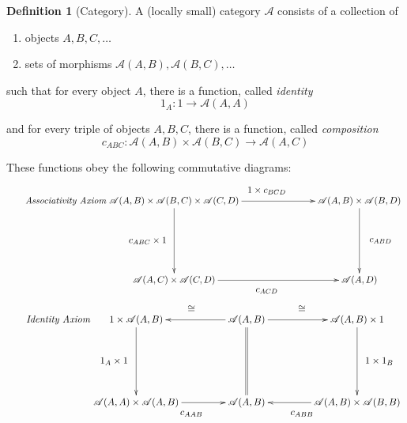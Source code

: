 \documentclass[11pt]{article}
\theoremstyle{definition}
\newtheorem*{defn}{Definition}
\theoremstyle{definition}
\theoremstyle{plain}
\theoremstyle{plain}
\theoremstyle{plain}
\begin{document}
\begin{defn}[Category]
A (locally small) category $\mathscr{A}$ consists of a collection of

\begin{enumerate}
\item objects $A, B, C, \dots$
\item sets of morphisms $\mathscr{A}(A,B), \mathscr{A}(B,C), \dots$
\end{enumerate}

such that for every object $A$, there is a function, called \emph{identity}
\begin{equation*}
1_A: 1 \to \mathscr{A}(A,A)
\end{equation*}

and for every triple of objects $A, B, C$, there is a function, called \emph{composition}
\begin{equation*}
c_{ABC}: \mathscr{A}(A,B) \times \mathscr{A}(B,C) \to \mathscr{A}(A,C)
\end{equation*}

These functions obey the following commutative diagrams:

\begin{equation*}\tag*{\emph{Associativity Axiom}}
\begin{xy}
(0,0)*+{\mathscr{A}(A,B) \times \mathscr{A}(B,C) \times \mathscr{A}(C,D)}="v1";
(70,0)*+{\mathscr{A}(A,B) \times \mathscr{A}(B,D)}="v2";
(0,-30)*+{\mathscr{A}(A,C) \times \mathscr{A}(C,D)}="v3";
(70,-30)*+{\mathscr{A}(A,D)}="v4";
{\ar "v1";"v2"}?*!/_4mm/{1 \times c_{BCD}};
{\ar "v1";"v3"}?*!/^10mm/{c_{ABC} \times 1};
{\ar "v2";"v4"}?*!/_8mm/{c_{ABD}};
{\ar "v3";"v4"}?*!/^4mm/{c_{ACD}};
\end{xy}
\end{equation*}

\begin{equation*}\tag*{\emph{Identity Axiom}}
\begin{xy}
(0,0)*+{1 \times \mathscr{A}(A,B)}="v1";
(40,0)*+{\mathscr{A}(A,B)}="v2";
(80,0)*+{\mathscr{A}(A,B) \times 1}="v3";
(0,-30)*+{\mathscr{A}(A,A) \times \mathscr{A}(A,B)}="v4";
(40,-30)*+{\mathscr{A}(A,B)}="v5";
(80,-30)*+{\mathscr{A}(A,B) \times \mathscr{A}(B,B)}="v6";
{\ar "v2";"v1"}?*!/^4mm/{\cong};
{\ar "v2";"v3"}?*!/_4mm/{\cong};
{\ar "v1";"v4"}?*!/^8mm/{1_A \times 1};
{\ar "v3";"v6"}?*!/_8mm/{1 \times 1_B};
{\ar "v4";"v5"}?*!/^4mm/{c_{AAB}};
{\ar "v6";"v5"}?*!/_4mm/{c_{ABB}};
{\ar@{=} "v2";"v5"}
\end{xy}
\end{equation*}
\end{defn}
\end{document}
